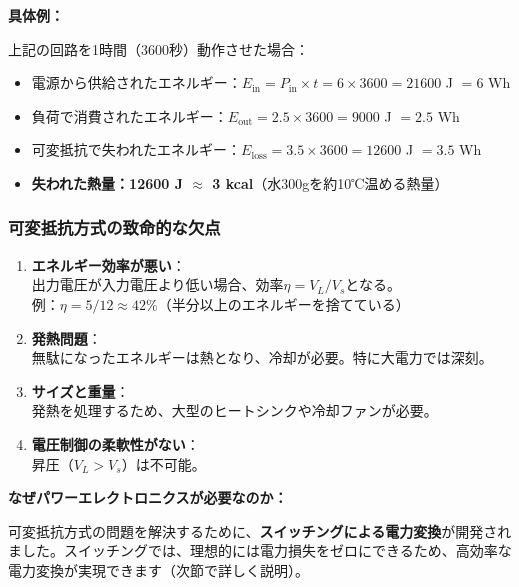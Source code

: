 \begin{screen}
\textbf{具体例：}

上記の回路を1時間（3600秒）動作させた場合：

\begin{itemize}
\item 電源から供給されたエネルギー：$E_{\text{in}} = P_{\text{in}} \times t = 6 \times 3600 = 21600$ J $= 6$ Wh

\item 負荷で消費されたエネルギー：$E_{\text{out}} = 2.5 \times 3600 = 9000$ J $= 2.5$ Wh

\item 可変抵抗で失われたエネルギー：$E_{\text{loss}} = 3.5 \times 3600 = 12600$ J $= 3.5$ Wh

\item \textbf{失われた熱量：12600 J $\approx$ 3 kcal}（水300gを約10℃温める熱量）
\end{itemize}
\end{screen}

\subsubsection{可変抵抗方式の致命的な欠点}

\begin{enumerate}
\item \textbf{エネルギー効率が悪い}：\\
出力電圧が入力電圧より低い場合、効率$\eta = V_L/V_s$となる。\\
例：$\eta = 5/12 \approx 42\%$（半分以上のエネルギーを捨てている）

\item \textbf{発熱問題}：\\
無駄になったエネルギーは熱となり、冷却が必要。特に大電力では深刻。

\item \textbf{サイズと重量}：\\
発熱を処理するため、大型のヒートシンクや冷却ファンが必要。

\item \textbf{電圧制御の柔軟性がない}：\\
昇圧（$V_L > V_s$）は不可能。
\end{enumerate}

\begin{screen}
\textbf{なぜパワーエレクトロニクスが必要なのか：}

可変抵抗方式の問題を解決するために、\textbf{スイッチングによる電力変換}が開発されました。スイッチングでは、理想的には電力損失をゼロにできるため、高効率な電力変換が実現できます（次節で詳しく説明）。
\end{screen}

